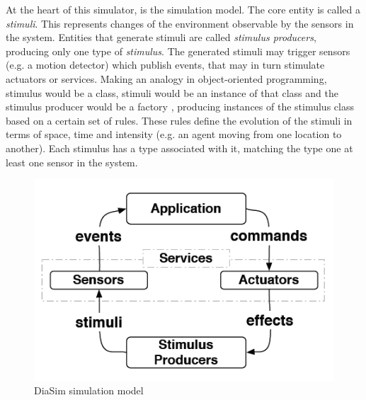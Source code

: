At the heart of this simulator, is the simulation model. The core entity is called a \emph{stimuli}. This represents changes of the environment observable by the sensors in the system. Entities that generate stimuli are called \emph{stimulus producers}, producing only one type of \emph{stimulus}. The generated stimuli may trigger sensors (e.g. a motion detector) which publish events, that may in turn stimulate actuators or services. Making an analogy in object-oriented programming, stimulus would be a class, stimuli would be an instance of that class and the stimulus producer would be a factory \cite{gamma1994design}, producing instances of the stimulus class based on a certain set of rules. These rules define the evolution of the stimuli in terms of space, time and intensity (e.g. an agent moving from one location to another). Each stimulus has a type associated with it, matching the type one at least one sensor in the system.\\

\begin{figure}[H]
	\centering
	\includegraphics[width=\linewidth]{gfx/Chapter2/diasim_simulation_model}
	\caption{DiaSim simulation model}
	\label{fig:diasim_simulation_model}
\end{figure}

